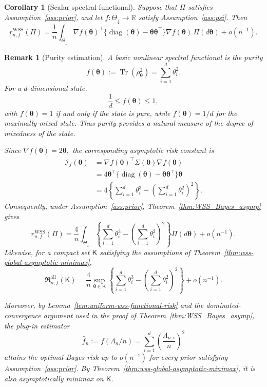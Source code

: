 \documentclass{article}
\newtheorem{corollary}[theorem]{Corollary}
\newtheorem{remark}{Remark}
\theoremstyle{named}
\theoremstyle{named1}
\newcommand{\Tr}{\operatorname{Tr}}
\newcommand{\diag}{\operatorname{diag}}
\newcommand{\WSS}{\mathrm{WSS}}
\newcommand{\btheta}{\boldsymbol{\theta}}
\newcommand{\cI}{\mathcal{I}}
\theoremstyle{plain}
\theoremstyle{remark}
\begin{document}
\begin{corollary}[Scalar spectral functional]
Suppose that $\Pi$ satisfies Assumption~\ref{ass:prior}, and let
$f:\Theta_{\downarrow}\to\mathbb R$ satisfy
Assumption~\ref{ass:psi}. Then
\[
r_{n,f}^{\WSS}(\Pi)
=\frac1n\int_{\Theta_{\downarrow}}
\nabla f(\btheta)^\top
\{\diag(\btheta)-\btheta\btheta^\top\}
\nabla f(\btheta)\,\Pi(d\btheta)
+o(n^{-1}).
\]
\end{corollary}
\begin{remark}[Purity estimation]
A basic nonlinear spectral functional is the purity
\[
    f(\btheta)
    :=
    \Tr(\rho_{\btheta}^2)
    =
    \sum_{i=1}^d \theta_i^2.
\]
For a $d$-dimensional state,
\[
    \frac{1}{d}\leq f(\btheta)\leq 1,
\]
with $f(\btheta)=1$ if and only if the state is pure, while
$f(\btheta)=1/d$ for the maximally mixed state. Thus purity provides a
natural measure of the degree of mixedness of the state.

Since
$\nabla f(\btheta)=2\btheta,
$
the corresponding asymptotic risk constant is
\begin{align*}
    \cI_f(\btheta)
    &=
    \nabla f(\btheta)^\top
    \Sigma(\btheta)
    \nabla f(\btheta)\\
    &=
    4\btheta^\top
    \bigl\{
        \diag(\btheta)-\btheta\btheta^\top
    \bigr\}
    \btheta\\
    &=
    4\left\{
        \sum_{i=1}^d\theta_i^3
        -
        \left(\sum_{i=1}^d\theta_i^2\right)^2
    \right\}.
\end{align*}
Consequently, under Assumption~\ref{ass:prior},
Theorem~\ref{thm:WSS_Bayes_asymp} gives
\[
    r_{n,f}^{\WSS}(\Pi)
    =
    \frac{4}{n}
    \int_{\Theta_{\downarrow}}
    \left\{
        \sum_{i=1}^d\theta_i^3
        -
        \left(\sum_{i=1}^d\theta_i^2\right)^2
    \right\}
    \Pi(d\btheta)
    +o(n^{-1}).
\]
Likewise, for a compact set $\mathsf K$ satisfying the assumptions of
Theorem~\ref{thm:wss-global-asymptotic-minimax},
\[
    \mathfrak R_{n,f}^{\mathrm{all}}(\mathsf K)
    =
    \frac{4}{n}
    \sup_{\btheta\in\mathsf K}
    \left\{
        \sum_{i=1}^d\theta_i^3
        -
        \left(\sum_{i=1}^d\theta_i^2\right)^2
    \right\}
    +o(n^{-1}).
\]

Moreover, by Lemma~\ref{lem:uniform-wss-functional-risk} and the
dominated-convergence argument used in the proof of
Theorem~\ref{thm:WSS_Bayes_asymp}, the plug-in estimator
\[
    \widehat f_n
    :=
    f(\Lambda_n/n)
    =
    \sum_{i=1}^d
    \left(\frac{\Lambda_{n,i}}{n}\right)^2
\]
attains the optimal Bayes risk up to $o(n^{-1})$ for every prior
satisfying Assumption~\ref{ass:prior}. By
Theorem~\ref{thm:wss-global-asymptotic-minimax}, it is also
asymptotically minimax on $\mathsf K$.
\end{remark}
\end{document}
